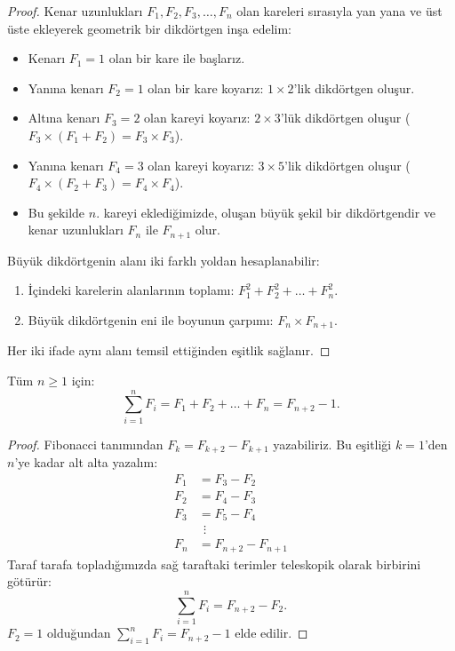 \begin{proof}
Kenar uzunlukları $F_1, F_2, F_3, \dots, F_n$ olan kareleri sırasıyla yan yana ve üst üste ekleyerek geometrik bir dikdörtgen inşa edelim:
\begin{itemize}
    \item Kenarı $F_1=1$ olan bir kare ile başlarız.
    \item Yanına kenarı $F_2=1$ olan bir kare koyarız: $1 \times 2$'lik dikdörtgen oluşur.
    \item Altına kenarı $F_3=2$ olan kareyi koyarız: $2 \times 3$'lük dikdörtgen oluşur ($F_3 \times (F_1+F_2) = F_3 \times F_3$).
    \item Yanına kenarı $F_4=3$ olan kareyi koyarız: $3 \times 5$'lik dikdörtgen oluşur ($F_4 \times (F_2+F_3) = F_4 \times F_4$).
    \item Bu şekilde $n$. kareyi eklediğimizde, oluşan büyük şekil bir dikdörtgendir ve kenar uzunlukları $F_n$ ile $F_{n+1}$ olur.
\end{itemize}
Büyük dikdörtgenin alanı iki farklı yoldan hesaplanabilir:
\begin{enumerate}
    \item İçindeki karelerin alanlarının toplamı: $F_1^2 + F_2^2 + \dots + F_n^2$.
    \item Büyük dikdörtgenin eni ile boyunun çarpımı: $F_n \times F_{n+1}$.
\end{enumerate}
Her iki ifade aynı alanı temsil ettiğinden eşitlik sağlanır.
\end{proof}

\begin{theorem}
Tüm $n \ge 1$ için:
\[
\sum_{i=1}^n F_i = F_1 + F_2 + \dots + F_n = F_{n+2} - 1.
\]
\end{theorem}

\begin{proof}
Fibonacci tanımından $F_k = F_{k+2} - F_{k+1}$ yazabiliriz. Bu eşitliği $k=1$'den $n$'ye kadar alt alta yazalım:
\begin{align*}
F_1 &= F_3 - F_2 \\
F_2 &= F_4 - F_3 \\
F_3 &= F_5 - F_4 \\
&\ \ \vdots \\
F_n &= F_{n+2} - F_{n+1}
\end{align*}
Taraf tarafa topladığımızda sağ taraftaki terimler teleskopik olarak birbirini götürür:
\[
\sum_{i=1}^n F_i = F_{n+2} - F_2.
\]
$F_2 = 1$ olduğundan $\sum_{i=1}^n F_i = F_{n+2} - 1$ elde edilir.
\end{proof}

